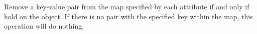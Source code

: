 Remove a key-value pair from the map specified by each attribute if and only if
 hold on the object.  If there is no pair with the specified key
within the map, this operation will do nothing.



